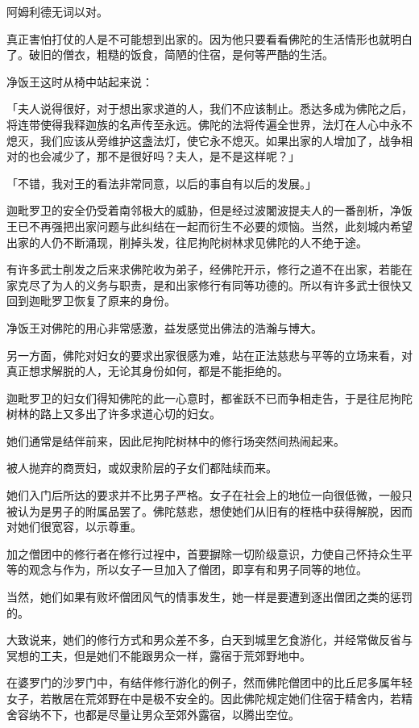 \documentclass[twoside,openany]{book}
\begin{document}
阿姆利德无词以对。

真正害怕打仗的人是不可能想到出家的。因为他只要看看佛陀的生活情形也就明白了。破旧的僧衣，粗糙的饭食，简陋的住宿，是何等严酷的生活。

净饭王这时从椅中站起来说：

「夫人说得很好，对于想出家求道的人，我们不应该制止。悉达多成为佛陀之后，将连带使得我释迦族的名声传至永远。佛陀的法将传遍全世界，法灯在人心中永不熄灭，我们应该从旁维护这盏法灯，使它永不熄灭。如果出家的人增加了，战争相对的也会减少了，那不是很好吗？夫人，是不是这样呢？」

「不错，我对王的看法非常同意，以后的事自有以后的发展。」

迦毗罗卫的安全仍受着南邻极大的威胁，但是经过波闍波提夫人的一番剖析，净饭王已不再强把出家问题与此纠结在一起而衍生不必要的烦恼。当然，此刻城内希望出家的人仍不断涌现，削掉头发，往尼拘陀树林求见佛陀的人不绝于途。

有许多武士削发之后来求佛陀收为弟子，经佛陀开示，修行之道不在出家，若能在家克尽了为人的义务与职责，是和出家修行有同等功德的。所以有许多武士很快又回到迦毗罗卫恢复了原来的身份。

净饭王对佛陀的用心非常感激，益发感觉出佛法的浩瀚与博大。

另一方面，佛陀对妇女的要求出家很感为难，站在正法慈悲与平等的立场来看，对真正想求解脱的人，无论其身份如何，都是不能拒绝的。

迦毗罗卫的妇女们得知佛陀的此一心意时，都雀跃不已而争相走告，于是往尼拘陀树林的路上又多出了许多求道心切的妇女。

她们通常是结伴前来，因此尼拘陀树林中的修行场突然间热闹起来。

被人抛弃的商贾妇，或奴隶阶层的子女们都陆续而来。

她们入门后所达的要求并不比男子严格。女子在社会上的地位一向很低微，一般只被认为是男子的附属品罢了。佛陀慈悲，想使她们从旧有的桎梏中获得解脱，因而对她们很宽容，以示尊重。

加之僧团中的修行者在修行过裎中，首要摒除一切阶级意识，力使自己怀持众生平等的观念与作为，所以女子一旦加入了僧团，即享有和男子同等的地位。

当然，她们如果有败坏僧团风气的情事发生，她一样是要遭到逐出僧团之类的惩罚的。

大致说来，她们的修行方式和男众差不多，白天到城里乞食游化，并经常做反省与冥想的工夫，但是她们不能跟男众一样，露宿于荒郊野地中。

在婆罗门的沙罗门中，有结伴修行游化的例子，然而佛陀僧团中的比丘尼多属年轻女子，若散居在荒郊野在中是极不安全的。因此佛陀规定她们住宿于精舍内，若精舍容纳不下，也都是尽量让男众至郊外露宿，以腾出空位。
\end{document}
